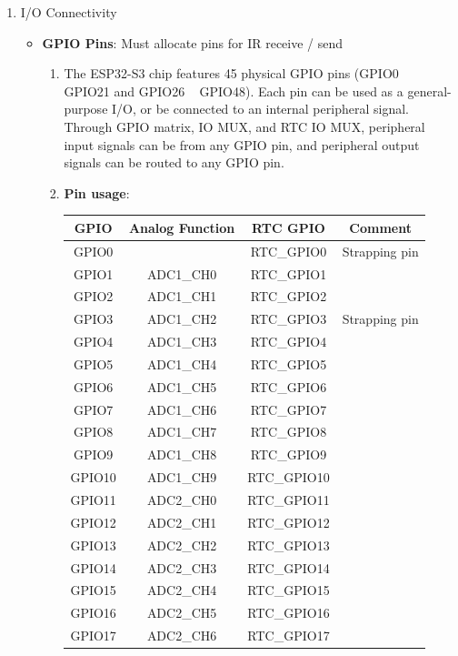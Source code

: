 \documentclass[conference]{IEEEtran}
\begin{document}
\begin{enumerate}[label=\arabic*.]
\begin{enumerate}[label=\alph*.]
\item I/O Connectivity\\
\begin{itemize}
\item \textbf{GPIO Pins}: Must allocate pins for IR receive / send\\
\begin{enumerate}[label=\roman*.]
\item The ESP32-S3 chip features 45 physical GPIO pins (GPIO0 ~ GPIO21 and GPIO26 ~ GPIO48). Each pin can be used as a general-purpose I/O, or be connected to an internal peripheral signal. Through GPIO matrix, IO MUX, and RTC IO MUX, peripheral input signals can be from any GPIO pin, and peripheral output signals can be routed to any GPIO pin. \\
\item \textbf{Pin usage}:\\
\begin{table}[ht]
\setlength{\extrarowheight}{2.5pt}
\centering
\begin{tabular}{|c|c|c|c|}
\hline
\textbf{GPIO} & \textbf{Analog Function} & \textbf{RTC GPIO} & \textbf{Comment} \\
\hline
GPIO0 &  & RTC\_GPIO0 & Strapping pin \\
GPIO1 & ADC1\_CH0 & RTC\_GPIO1 &  \\
GPIO2 & ADC1\_CH1 & RTC\_GPIO2 &  \\
GPIO3 & ADC1\_CH2 & RTC\_GPIO3 & Strapping pin \\
GPIO4 & ADC1\_CH3 & RTC\_GPIO4 &  \\
GPIO5 & ADC1\_CH4 & RTC\_GPIO5 &  \\
GPIO6 & ADC1\_CH5 & RTC\_GPIO6 &  \\
GPIO7 & ADC1\_CH6 & RTC\_GPIO7 &  \\
GPIO8 & ADC1\_CH7 & RTC\_GPIO8 &  \\
GPIO9 & ADC1\_CH8 & RTC\_GPIO9 &  \\
GPIO10 & ADC1\_CH9 & RTC\_GPIO10 &  \\
GPIO11 & ADC2\_CH0 & RTC\_GPIO11 &  \\
GPIO12 & ADC2\_CH1 & RTC\_GPIO12 &  \\
GPIO13 & ADC2\_CH2 & RTC\_GPIO13 &  \\
GPIO14 & ADC2\_CH3 & RTC\_GPIO14 &  \\
GPIO15 & ADC2\_CH4 & RTC\_GPIO15 &  \\
GPIO16 & ADC2\_CH5 & RTC\_GPIO16 &  \\
GPIO17 & ADC2\_CH6 & RTC\_GPIO17 &  \\

\end{tabular}
\end{table}
\end{enumerate}
\end{itemize}
\end{enumerate}
\end{enumerate}
\end{document}
